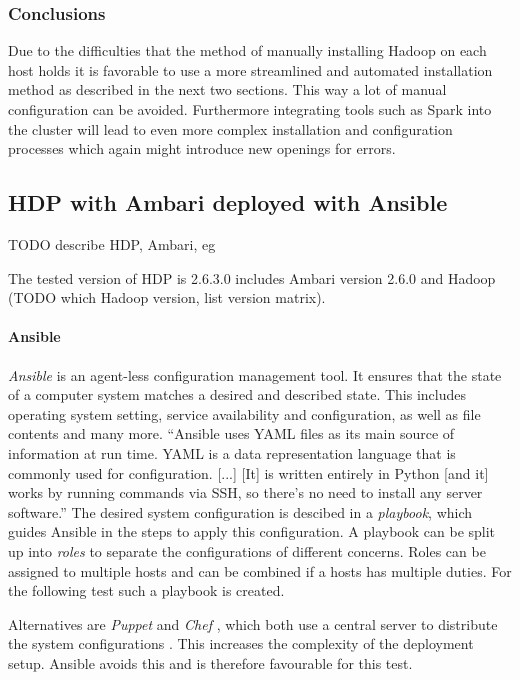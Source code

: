 \subsubsection{Conclusions}

Due to the difficulties that the method of manually installing Hadoop on each host holds it is favorable to use a more streamlined 
and automated installation method as described in the next two sections.
This way a lot of manual configuration can be avoided.
Furthermore integrating tools such as Spark into the cluster 
will lead to even more complex installation and configuration processes which again might introduce new openings for errors.

\subsection{\acl{HDP} with Ambari deployed with Ansible}
\label{sec:design:hdp_ambari_ansible}
TODO describe HDP, Ambari,
eg \autocite[][]{hortonworks2018ambari}

The tested version of \ac{HDP} is 2.6.3.0 includes Ambari version 2.6.0 and Hadoop (TODO which Hadoop version, list version matrix).

\paragraph{Ansible}
\emph{Ansible} is an agent-less configuration management tool.
It ensures that the state of a computer system matches a desired and described state.
This includes operating system setting, service availability and configuration, 
as well as file contents and many more.
\enquote{Ansible uses \ac{YAML} files as its main source of information at run time. 
\ac{YAML} is a data representation language that is commonly used for configuration.
[...]
[It] is written entirely in Python [and it] works by running commands via \ac{SSH}, so there’s no need to install any server software.}
\autocite[][Chap. 1]{heap2016ansible}
The desired system configuration is descibed in a \emph{playbook}, 
which guides Ansible in the steps to apply this configuration.
A playbook can be split up into \emph{roles} to separate the configurations of different concerns.
Roles can be assigned to multiple hosts and can be combined if a hosts has multiple duties.
For the following test such a playbook is created.

Alternatives are \emph{Puppet}  and \emph{Chef}  , which both use a central server to distribute the system configurations \autocite[][Chap. 1]{heap2016ansible}. 
This increases the complexity of the deployment setup.
Ansible avoids this and is therefore favourable for this test.


